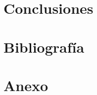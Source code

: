 \documentclass[12pt,a4paper]{article}
\begin{document}
\section{Conclusiones} %

\section{Bibliografía} %
\renewcommand{\bibsection}{}
%

\newpage
\listoffigures
\listoftables
\newpage
\section{Anexo}
\end{document}

